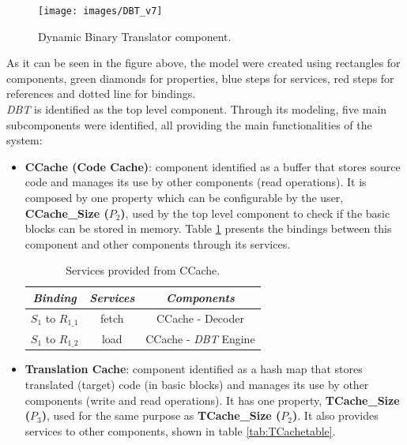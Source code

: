 \documentclass[12pt]{article}
\begin{document}
{\begin{figure}[!htb]
\centerline{
\texttt{[image: images/DBT\_v7]}
}
\caption{Dynamic Binary Translator component.}
\label{fig:DBT_component} 
\end{figure}

As it can be seen in the figure above, the model were created using rectangles for components, green diamonds for properties, blue steps for services, red steps for references and dotted line for bindings. \\ 

\textit{DBT} is identified as the top level component. Through its modeling, five main subcomponents were identified, all providing the main functionalities of the system: 

\begin{itemize}
\item \textbf{CCache (Code Cache)}: component identified as a buffer that stores source code and manages its use by other components (read operations). It is composed by one property which can be configurable by the user, \textbf{CCache\_Size ($P_2$)}, used by the top level component to check if the basic blocks can be stored in memory. Table \ref{tab:CCachetable} presents the bindings between this component and other components through its services.

\begin{table}[!htb]
\centering
\caption{Services provided from CCache.}
\label{tab:CCachetable}
\begin{tabular}{|c|c|c|}
\hline
\textit{\textbf{Binding}}     & \textit{\textbf{Services}}   &   \textit{\textbf{Components}}     				\\ \hline
$S_{1}$ to $R_{1\_1}$  & fetch  & CCache - Decoder      \\ \hline
$S_{1}$ to $R_{1\_2}$  & load & CCache - \textit{DBT} Engine     \\ \hline
\end{tabular}
\end{table}

\item \textbf{Translation Cache}: component identified as a hash map that stores translated (target) code (in basic blocks) and manages its use by other components (write and read operations). It has one property,  \textbf{TCache\_Size ($P_3$)}, used for the same purpose as \textbf{TCache\_Size ($P_2$)}. It also provides services to other components, shown in table \ref{tab:TCachetable}.


\end{itemize}}
\end{document}
